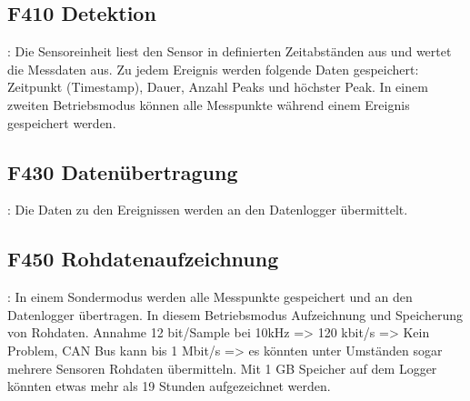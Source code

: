 \subsection{F410 Detektion}: Die Sensoreinheit liest den Sensor in definierten Zeitabständen aus und wertet die Messdaten aus. Zu jedem Ereignis werden folgende Daten gespeichert: Zeitpunkt (Timestamp), Dauer, Anzahl Peaks und höchster Peak. In einem zweiten Betriebsmodus können alle Messpunkte während einem Ereignis gespeichert werden.

\subsection{F430 Datenübertragung}: Die Daten zu den Ereignissen werden an den Datenlogger übermittelt.

\subsection{F450 Rohdatenaufzeichnung}: In einem Sondermodus werden alle Messpunkte gespeichert und an den Datenlogger übertragen. In diesem Betriebsmodus  Aufzeichnung und Speicherung von Rohdaten. Annahme 12 bit/Sample bei 10kHz => 120 kbit/s => Kein Problem, CAN Bus kann bis 1 Mbit/s => es könnten unter Umständen sogar mehrere Sensoren Rohdaten übermitteln. Mit 1 GB Speicher auf dem Logger könnten etwas mehr als 19 Stunden aufgezeichnet werden.

